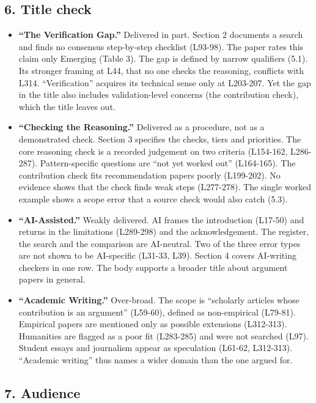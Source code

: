 {\subsection{6. Title check}\label{title-check}

\begin{itemize}
\tightlist
\item
  \textbf{``The Verification Gap.''} Delivered in part. Section 2
  documents a search and finds no consensus step-by-step checklist
  (L93-98). The paper rates this claim only Emerging (Table 3). The gap
  is defined by narrow qualifiers (5.1). Its stronger framing at L44,
  that no one checks the reasoning, conflicts with L314.
  ``Verification'' acquires its technical sense only at L203-207. Yet
  the gap in the title also includes validation-level concerns (the
  contribution check), which the title leaves out.
\item
  \textbf{``Checking the Reasoning.''} Delivered as a procedure, not as
  a demonstrated check. Section 3 specifies the checks, tiers and
  priorities. The core reasoning check is a recorded judgement on two
  criteria (L154-162, L286-287). Pattern-specific questions are ``not
  yet worked out'' (L164-165). The contribution check fits
  recommendation papers poorly (L199-202). No evidence shows that the
  check finds weak steps (L277-278). The single worked example shows a
  scope error that a source check would also catch (5.3).
\item
  \textbf{``AI-Assisted.''} Weakly delivered. AI frames the introduction
  (L17-50) and returns in the limitations (L289-298) and the
  acknowledgement. The register, the search and the comparison are
  AI-neutral. Two of the three error types are not shown to be
  AI-specific (L31-33, L39). Section 4 covers AI-writing checkers in one
  row. The body supports a broader title about argument papers in
  general.
\item
  \textbf{``Academic Writing.''} Over-broad. The scope is ``scholarly
  articles whose contribution is an argument'' (L59-60), defined as
  non-empirical (L79-81). Empirical papers are mentioned only as
  possible extensions (L312-313). Humanities are flagged as a poor fit
  (L283-285) and were not searched (L97). Student essays and journalism
  appear as speculation (L61-62, L312-313). ``Academic writing'' thus
  names a wider domain than the one argued for.
\end{itemize}

\subsection{7. Audience}\label{audience}

}
